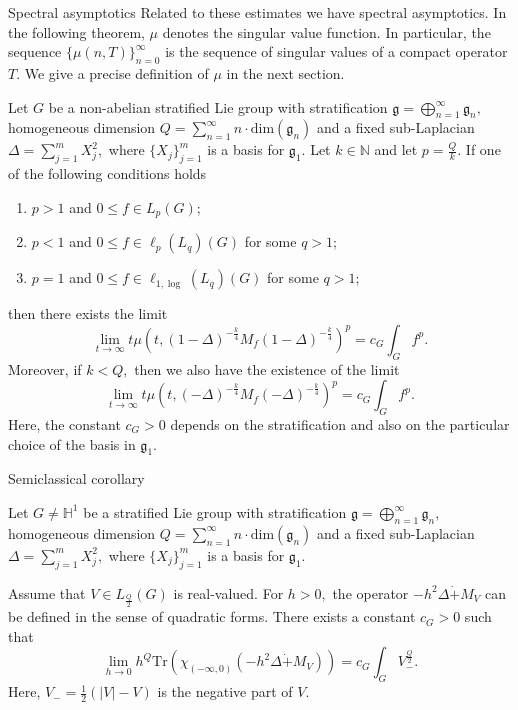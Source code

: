 \documentclass{beamer}
\numberwithin{equation}{section}
\theoremstyle{plain}
\theoremstyle{plain}
\theoremstyle{definition}
\theoremstyle{plain}
\theoremstyle{plain}
\theoremstyle{definition}
\newcommand{\Tr}{\mathrm{Tr}}
\newcommand{\gf}{\mathfrak{g}}
\begin{document}
\begin{frame}{Spectral asymptotics}
Related to these estimates we have spectral asymptotics. In the following theorem, $\mu$ denotes the singular value function. In particular, the sequence $\{\mu(n,T)\}_{n=0}^\infty$ is the sequence of singular values of a compact operator $T.$ We give a precise definition of $\mu$ in the next section.
\begin{theorem}\label{main_asymptotic_formula}
Let $G$ be a non-abelian stratified Lie group with stratification $\gf = \bigoplus_{n=1}^\infty \gf_n,$ homogeneous dimension $Q = \sum_{n=1}^\infty n\cdot \mathrm{dim}(\gf_n)$
and a fixed sub-Laplacian $\Delta = \sum_{j=1}^m X_j^2,$ where $\{X_j\}_{j=1}^m$ is a basis for $\gf_1.$ Let $k\in\mathbb{N}$ and let $p=\frac{Q}{k}.$ If one of the following conditions holds
\begin{enumerate}[{\rm (i)}]
\item{} $p>1$ and $0\leq f \in L_p(G);$
\item{} $p<1$ and $0\leq f\in \ell_p(L_q)(G)$ for some $q>1;$
\item{} $p=1$ and $0\leq f\in \ell_{1,\log}(L_q)(G)$ for some $q>1;$
\end{enumerate}
then there exists the limit
$$\lim_{t\to\infty} t\mu(t,(1-\Delta)^{-\frac{k}{4}}M_f(1-\Delta)^{-\frac{k}{4}})^p=c_G\int_G f^p.$$
Moreover, if $k<Q,$ then we also have the existence of the limit
$$\lim_{t\to\infty} t\mu(t,(-\Delta)^{-\frac{k}{4}}M_f(-\Delta)^{-\frac{k}{4}})^p=c_G\int_G f^p.$$
Here, the constant $c_G>0$ depends on the stratification and also on the particular choice of the basis in $\gf_1.$
\end{theorem}
\end{frame}


\begin{frame}{Semiclassical corollary}
\begin{corollary}
    Let $G\neq\mathbb{H}^1$ be a stratified Lie group with stratification $\gf = \bigoplus_{n=1}^\infty \gf_n,$ homogeneous dimension $Q = \sum_{n=1}^\infty n\cdot \mathrm{dim}(\gf_n)$
    and a fixed sub-Laplacian $\Delta = \sum_{j=1}^m X_j^2,$ where $\{X_j\}_{j=1}^m$ is a basis for $\gf_1.$

    Assume that $V\in L_{\frac{Q}{2}}(G)$ is real-valued. For $h>0,$ the operator $-h^2\Delta\dot{+}M_V$ can be defined in the sense of quadratic forms.
    There exists a constant $c_{G}>0$ such that
    \[
        \lim_{h\to 0} h^{Q}\Tr(\chi_{(-\infty,0)}(-h^2\Delta\dot{+}M_V)) = c_{G}\int_{G} V_-^{\frac{Q}{2}}.
    \]
    Here, $V_- = \frac{1}{2}(|V|-V)$ is the negative part of $V.$
\end{corollary}
\end{frame}
\end{document}
